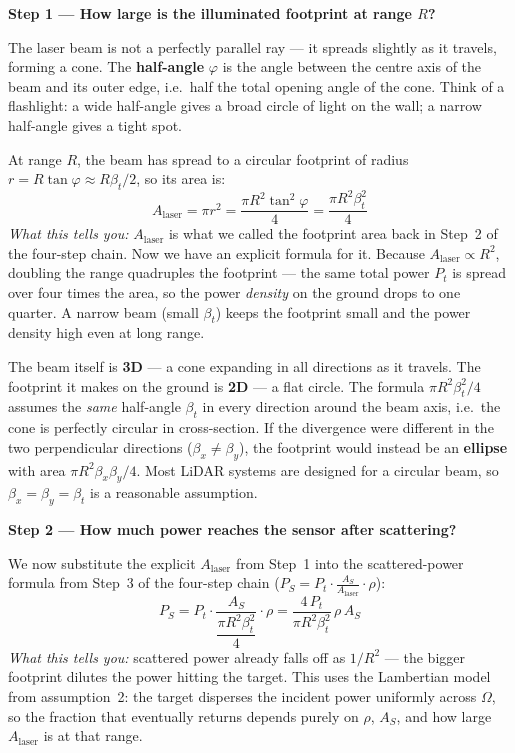 \documentclass[12pt, a4paper]{article}
\begin{document}
\textbf{Step 1 --- How large is the illuminated footprint at range $R$?}

The laser beam is not a perfectly parallel ray --- it spreads slightly as
it travels, forming a cone.
The \textbf{half-angle} $\varphi$ is the angle between the centre axis of
the beam and its outer edge, i.e.\ half the total opening angle of the cone.
Think of a flashlight: a wide half-angle gives a broad circle of light on
the wall; a narrow half-angle gives a tight spot.

At range $R$, the beam has spread to a circular footprint of radius
$r = R\tan\varphi \approx R\beta_t/2$, so its area is:
\[
  A_\text{laser}
  = \pi r^2
  = \frac{\pi R^2 \tan^2\!\varphi}{4}
  = \frac{\pi R^2 \beta_t^2}{4}
\]
\textit{What this tells you:} $A_\text{laser}$ is what we called the
footprint area back in Step~2 of the four-step chain.  Now we have an
explicit formula for it.  Because $A_\text{laser} \propto R^2$, doubling
the range quadruples the footprint --- the same total power $P_t$ is
spread over four times the area, so the power \emph{density} on the ground
drops to one quarter.  A narrow beam (small $\beta_t$) keeps the footprint
small and the power density high even at long range.

\begin{warnbox}
The beam itself is \textbf{3D} --- a cone expanding in all directions as it
travels.  The footprint it makes on the ground is \textbf{2D} --- a flat
circle.  The formula $\pi R^2\beta_t^2/4$ assumes the \emph{same}
half-angle $\beta_t$ in every direction around the beam axis, i.e.\ the
cone is perfectly circular in cross-section.  If the divergence were
different in the two perpendicular directions ($\beta_x \neq \beta_y$),
the footprint would instead be an \textbf{ellipse} with area
$\pi R^2 \beta_x \beta_y / 4$.  Most LiDAR systems are designed for a
circular beam, so $\beta_x = \beta_y = \beta_t$ is a reasonable
assumption.
\end{warnbox}

\textbf{Step 2 --- How much power reaches the sensor after scattering?}

We now substitute the explicit $A_\text{laser}$ from Step~1 into the
scattered-power formula from Step~3 of the four-step chain
($P_S = P_t \cdot \tfrac{A_S}{A_\text{laser}} \cdot \rho$):
\[
  P_S
  = P_t \cdot \frac{A_S}{\dfrac{\pi R^2 \beta_t^2}{4}} \cdot \rho
  = \frac{4\,P_t}{\pi R^2 \beta_t^2}\,\rho\,A_S
\]
\textit{What this tells you:} scattered power already falls off as
$1/R^2$ --- the bigger footprint dilutes the power hitting the target.
This uses the Lambertian model from assumption~2: the target disperses
the incident power uniformly across $\Omega$, so the fraction that
eventually returns depends purely on $\rho$, $A_S$, and how large
$A_\text{laser}$ is at that range.
\end{document}
